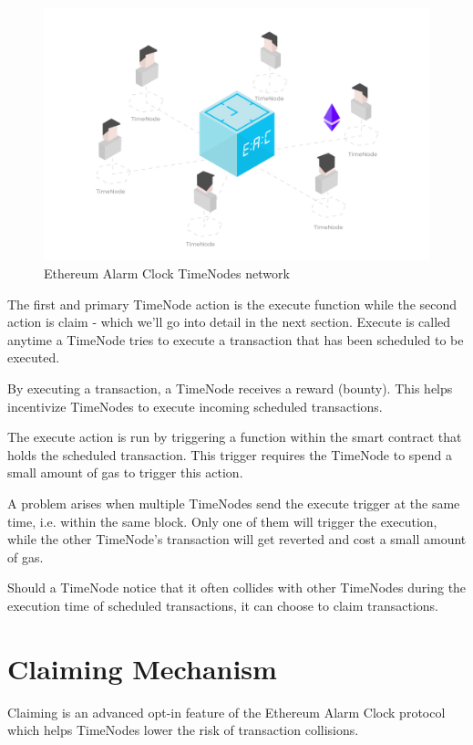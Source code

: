 \documentclass{report}
\begin{document}
  \begin{figure}[h]
    \includegraphics[width=\textwidth]{diagram1}
    \caption{Ethereum Alarm Clock TimeNodes network}
  \end{figure}

  The first and primary TimeNode action is the execute function while the second action is claim - which we'll go into detail in the next section. Execute is called anytime a TimeNode tries to execute a transaction that has been scheduled to be executed.

  By executing a transaction, a TimeNode receives a reward (bounty). This helps incentivize TimeNodes to execute incoming scheduled transactions.

  The execute action is run by triggering a function within the smart contract that holds the scheduled transaction. This trigger requires the TimeNode to spend a small amount of gas to trigger this action.

  A problem arises when multiple TimeNodes send the execute trigger at the same time, i.e. within the same block. Only one of them will trigger the execution, while the other TimeNode’s transaction will get reverted and cost a small amount of gas.

  Should a TimeNode notice that it often collides with other TimeNodes during the execution time of scheduled transactions, it can choose to claim transactions.

  \section{Claiming Mechanism}
  Claiming is an advanced opt-in feature of the Ethereum Alarm Clock protocol which helps TimeNodes lower the risk of transaction collisions.
\end{document}
